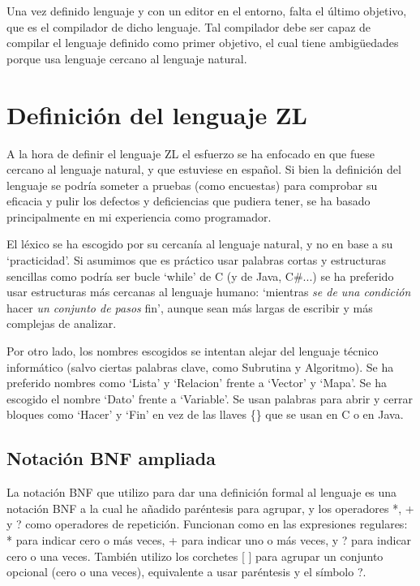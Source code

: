\documentclass{report}
\begin{document}
	Una vez definido lenguaje y  con un editor en el entorno, falta el último objetivo, que es el compilador de dicho lenguaje. Tal compilador debe ser capaz de compilar el lenguaje definido como primer objetivo, el cual tiene ambigüedades porque usa lenguaje cercano al lenguaje natural.
	
	\section{Definición del lenguaje ZL}
	
	A la hora de definir el lenguaje ZL el esfuerzo se ha enfocado en que fuese cercano al lenguaje natural, y que estuviese en español\cite{mundoingles}. Si bien la definición del lenguaje se podría someter a pruebas (como encuestas) para comprobar su eficacia y pulir los defectos y deficiencias que pudiera tener, se ha basado principalmente en mi experiencia como programador. 
	
	\vspace{10px}
	
	El léxico se ha escogido por su cercanía al lenguaje natural, y no en base a su `practicidad'. Si asumimos que es práctico usar palabras cortas y estructuras sencillas como podría ser bucle `while' de C (y de Java, C\#...) se ha preferido usar estructuras más cercanas al lenguaje humano: `mientras \textit{se de una condición} hacer \textit{un conjunto de pasos} fin', aunque sean más largas de escribir y más complejas de analizar.
	
	\vspace{10px}
	
	Por otro lado, los nombres escogidos se intentan alejar del lenguaje técnico informático (salvo ciertas palabras clave, como Subrutina y Algoritmo). Se ha preferido nombres como `Lista' y `Relacion' frente a `Vector' y `Mapa'. Se ha escogido el nombre `Dato' frente a `Variable'. Se usan palabras para abrir y cerrar bloques como `Hacer' y `Fin' en vez de las llaves \{\} que se usan en C o en Java. 
	
	\vspace{10px}
	
	\subsection{Notación BNF ampliada}
	
	La notación BNF que utilizo para dar una definición formal al lenguaje es una notación BNF a la cual he añadido paréntesis para agrupar, y los operadores *, + y ? como operadores de repetición. Funcionan como en las expresiones regulares: * para indicar cero o más veces, + para indicar uno o más veces, y ? para indicar cero o una veces. También utilizo los corchetes [
	] para agrupar un conjunto opcional (cero o una veces), equivalente a usar paréntesis y el símbolo ?.
	
\end{document}
